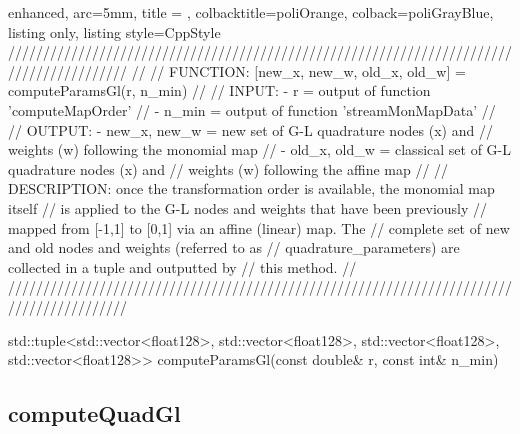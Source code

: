 \documentclass[a4paper, twosided]{book}
\begin{document}
\begin{tcblisting}{enhanced,
                   arc=5mm,
                   title = \color{black}{\large \ttfamily MonMap.cpp/computeParamsGl},
                   colbacktitle=poliOrange,
                   colback=poliGrayBlue,
                   listing only,
                   listing style=CppStyle}
/////////////////////////////////////////////////////////////////////////////////////////
//
//       FUNCTION: [{new_x, new_w, old_x, old_w}] = computeParamsGl(r, n_min)
//                
//          INPUT: - r = output of function 'computeMapOrder'
//                 - n_min = output of function 'streamMonMapData'
//
//         OUTPUT: - {new_x, new_w} = new set of G-L quadrature nodes (x) and
//                                    weights (w) following the monomial map
//                 - {old_x, old_w} = classical set of G-L quadrature nodes (x) and
//                                    weights (w) following the affine map
//
//    DESCRIPTION: once the transformation order is available, the monomial map itself
//                 is applied to the G-L nodes and weights that have been previously
//                 mapped from [-1,1] to [0,1] via an affine (linear) map. The 
//                 complete set of new and old nodes and weights (referred to as
//                 quadrature_parameters) are collected in a tuple and outputted by
//                 this method.
//
/////////////////////////////////////////////////////////////////////////////////////////

std::tuple<std::vector<float128>, std::vector<float128>, std::vector<float128>, std::vector<float128>> computeParamsGl(const double& r, const int& n_min)
\end{tcblisting}

\newpage
\subsection[computeQuadGl]{\changefont computeQuadGl}\label{Sec4.1.5}
\end{document}
